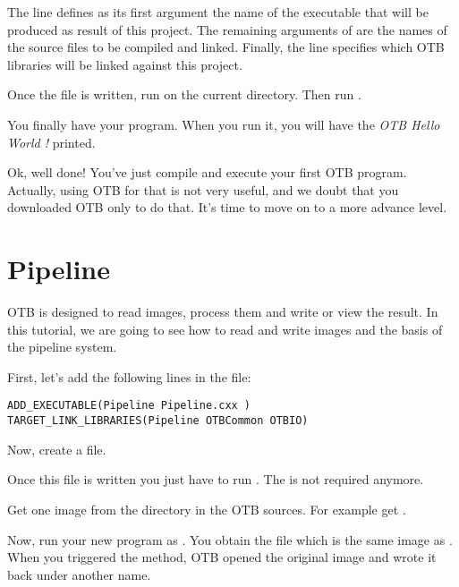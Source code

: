 The line  defines as its first argument the name of the executable that will be produced as result of this project. The remaining arguments of  are the names of the source files to be compiled and linked.  Finally, the  line specifies which OTB libraries will be linked against this project.



Once the file is written, run  on the current directory. Then run .

You finally have your program. When you run it, you will have the {\em OTB Hello World !} printed.

Ok, well done! You've just compile and execute your first OTB program. Actually, using OTB for that is not very useful, and we doubt that you downloaded OTB only to do that. It's time to move on to a more advance level.


\section{Pipeline}
\label{sec:TutorialPipeline}


OTB is designed to read images, process them and write or view the result. In this tutorial, we are going to see how to read and write images and the basis of the pipeline system.

First, let's add the following lines in the  file:

\small
\begin{verbatim}
ADD_EXECUTABLE(Pipeline Pipeline.cxx )
TARGET_LINK_LIBRARIES(Pipeline OTBCommon OTBIO)
\end{verbatim}

Now, create a  file.



Once this file is written you just have to run . The  is not required anymore.

Get one image from the  directory in the OTB sources. For example get . 

Now, run your new program as . You obtain the file  which is the same image as . When you triggered the  method, OTB opened the original image and wrote it back under another name. 

